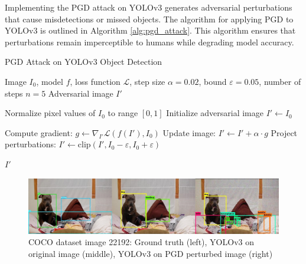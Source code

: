 \documentclass[10pt]{cai}
\begin{document}
Implementing the PGD attack on YOLOv3 generates adversarial perturbations that cause misdetections or missed objects. The algorithm for applying PGD to YOLOv3 is outlined in Algorithm \ref{alg:pgd_attack}. This algorithm ensures that perturbations remain imperceptible to humans while degrading model accuracy.

\begin{algorithm}
    \caption{PGD Attack on YOLOv3 Object Detection}
    \label{alg:pgd_attack}
    \begin{algorithmic}[1]
    \REQUIRE Image $I_0$, model $f$, loss function $\mathcal{L}$, step size $\alpha = 0.02$, bound $\varepsilon = 0.05$, number of steps $n = 5$
    \ENSURE Adversarial image $I'$
    
    \STATE Normalize pixel values of $I_0$ to range $[0, 1]$
    \STATE Initialize adversarial image $I' \gets I_0$
    
        \STATE Compute gradient: $g \gets \nabla_{I'} \mathcal{L}(f(I'), I_0)$
        \STATE Update image: $I' \gets I' + \alpha \cdot g$
        \STATE Project perturbations: $I' \gets \text{clip}(I', I_0 - \varepsilon, I_0 + \varepsilon)$
    \ENDFOR
    
    \RETURN $I'$
    \end{algorithmic}
\end{algorithm}

\begin{figure}
    \centering
    \captionsetup{justification=centering}
    \includegraphics[width=1.0\linewidth]{figs/dog1.jpg}
    \caption{COCO dataset image 22192: Ground truth (left), YOLOv3 on original image (middle), YOLOv3 on PGD perturbed image (right) }
    \label{fig:dog1}
\end{figure}
\end{document}
